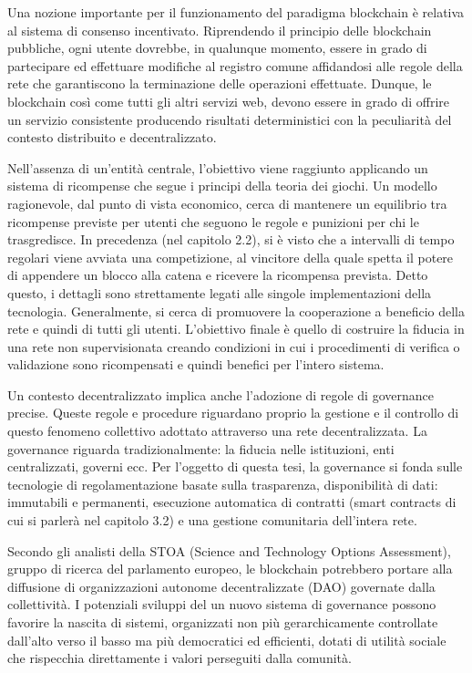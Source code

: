 Una nozione importante per il funzionamento del paradigma blockchain è relativa al sistema di consenso incentivato. Riprendendo il principio delle blockchain pubbliche, ogni utente dovrebbe, in qualunque momento, essere in grado di partecipare ed effettuare modifiche al registro comune affidandosi alle regole della rete che garantiscono la terminazione delle operazioni effettuate. Dunque, le blockchain così come tutti gli altri servizi web, devono essere in grado di offrire un servizio consistente producendo risultati deterministici con la peculiarità del contesto distribuito e decentralizzato.

Nell’assenza di un’entità centrale, l’obiettivo viene raggiunto applicando un sistema di ricompense che segue i principi della teoria dei giochi. Un modello ragionevole, dal punto di vista economico, cerca di mantenere un equilibrio tra ricompense previste per utenti che seguono le regole e punizioni per chi le trasgredisce. In precedenza (nel capitolo 2.2), si è visto che a intervalli di tempo regolari viene avviata una competizione, al vincitore della quale spetta il potere di appendere un blocco alla catena e ricevere la ricompensa prevista. Detto questo, i dettagli sono strettamente legati alle singole implementazioni della tecnologia. Generalmente, si cerca di promuovere la cooperazione a beneficio della rete e quindi di tutti gli utenti. L'obiettivo finale è quello di costruire la fiducia in una rete non supervisionata creando condizioni in cui i procedimenti di verifica o validazione sono ricompensati e quindi benefici per l’intero sistema.

Un contesto decentralizzato implica anche l’adozione di regole di governance precise. Queste regole e procedure riguardano proprio la gestione e il controllo di questo fenomeno collettivo adottato attraverso una rete decentralizzata. La governance riguarda tradizionalmente: la fiducia nelle istituzioni, enti centralizzati, governi ecc. Per l’oggetto di questa tesi, la governance si fonda sulle tecnologie di regolamentazione basate sulla trasparenza, disponibilità di dati: immutabili e permanenti, esecuzione automatica di contratti (smart contracts di cui si parlerà nel capitolo 3.2) e una gestione comunitaria dell’intera rete.

Secondo gli analisti della STOA (Science and Technology Options Assessment), gruppo di ricerca del parlamento europeo, le blockchain potrebbero portare alla diffusione di organizzazioni autonome decentralizzate (DAO) governate dalla collettività. I potenziali sviluppi del un nuovo sistema di governance possono favorire la nascita di sistemi, organizzati non più gerarchicamente controllate dall’alto verso il basso ma più democratici ed efficienti, dotati di utilità sociale che rispecchia direttamente i valori perseguiti dalla comunità.

